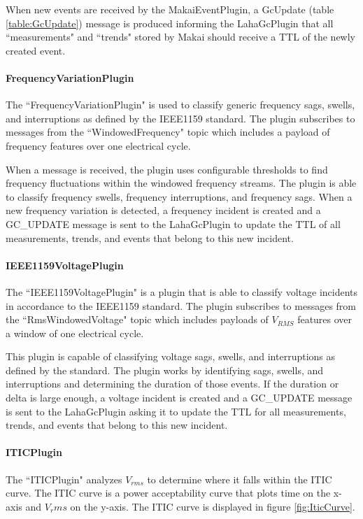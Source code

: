 When new events are received by the MakaiEventPlugin, a GcUpdate (table \ref{table:GcUpdate}) message is produced informing the LahaGcPlugin that all ``measurements" and ``trends" stored by Makai should receive a TTL of the newly created event.

\paragraph{FrequencyVariationPlugin}
The ``FrequencyVariationPlugin" is used to classify generic frequency sags, swells, and interruptions as defined by the IEEE1159 standard\cite{IEEE:2018:1159D3}. The plugin subscribes to messages from the ``WindowedFrequency" topic which includes a payload of frequency features over one electrical cycle.

When a message is received, the plugin uses configurable thresholds to find frequency fluctuations within the windowed frequency streams. The plugin is able to classify frequency swells, frequency interruptions, and frequency sags. When a new frequency variation is detected, a frequency incident is created and a GC\_UPDATE message is sent to the LahaGcPlugin to update the TTL of all measurements, trends, and events that belong to this new incident.

\paragraph{IEEE1159VoltagePlugin}
The ``IEEE1159VoltagePlugin" is a plugin that is able to classify voltage incidents in accordance to the IEEE1159 standard\cite{IEEE:2018:1159D3}. The plugin subscribes to messages from the ``RmsWindowedVoltage" topic which includes payloads of $V_{RMS}$ features over a window of one electrical cycle.

This plugin is capable of classifying voltage sags, swells, and interruptions as defined by the standard. The plugin works by identifying sags, swells, and interruptions and determining the duration of those events. If the duration or delta is large enough, a voltage incident is created and a GC\_UPDATE message is sent to the LahaGcPlugin asking it to update the TTL for all measurements, trends, and events that belong to this new incident.

\paragraph{ITICPlugin}
The ``ITICPlugin" analyzes $V_{rms}$ to determine where it falls within the ITIC curve\cite{thallam2000power}. The ITIC curve is a power acceptability curve that plots time on the x-axis and $V_rms$ on the y-axis. The ITIC curve is displayed in figure \ref{fig:IticCurve}.

